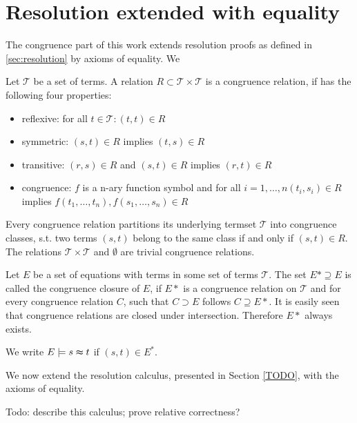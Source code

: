 \section*{Resolution extended with equality}

The congruence part of this work extends resolution proofs as defined in \ref{sec:resolution} by axioms of equality.
We

Let $\mathcal{T}$ be a set of terms.
A relation $R \subset \mathcal{T} \times \mathcal{T}$ is a congruence relation, if has the following four properties:
\begin{itemize}
	\item reflexive: for all $t \in \mathcal{T}: (t,t) \in R$
	\item symmetric: $(s,t) \in R$ implies $(t,s) \in R$
	\item transitive: $(r,s) \in R$ and $(s,t) \in R$ implies $(r,t) \in R$
	\item congruence: $f$ is a n-ary function symbol and for all $i = 1,\ldots,n (t_i,s_i) \in R$ implies $f(t_1,\ldots,t_n),f(s_1,\ldots,s_n) \in R$
\end{itemize}

Every congruence relation partitions its underlying termset $\mathcal{T}$ into congruence classes, s.t. two terms $(s,t)$ belong to the same class if and only if $(s,t) \in R$.
The relations $\mathcal{T} \times \mathcal{T}$ and $\emptyset$ are trivial congruence relations.

Let $E$ be a set of equations with terms in some set of terms $\mathcal{T}$.
The set $E* \supseteq E$ is called the congruence closure of $E$, 
if $E*$ is a congruence relation on $\mathcal{T}$ and for every congruence relation $C$, such that $C \supset E$ follows $C \supseteq E*$.
It is easily seen that congruence relations are closed under intersection.
Therefore $E*$ always exists.

We write $E \models s \thickapprox t$ if $(s,t) \in E^*$.

We now extend the resolution calculus, presented in Section \ref{TODO}, with the axioms of equality.

{\color{blue} Todo: describe this calculus; prove relative correctness?}